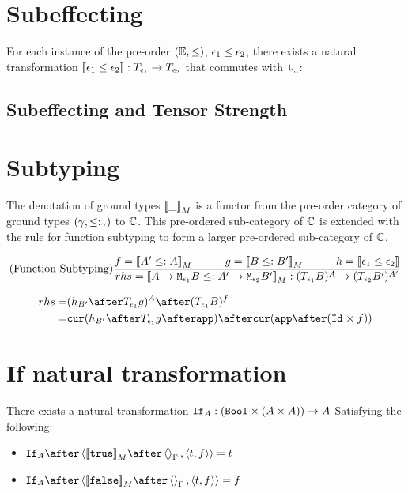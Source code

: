 \documentclass{report}
\begin{document}
\section{Subeffecting}
For each instance of the pre-order $(\mathbb{E}, \leq)$, $\epsilon_1 \leq \epsilon_2$, there exists a natural transformation
${\bf [\![}\epsilon_1 \leq \epsilon_2{\bf ]\!]}: T_{\epsilon_1}{} \rightarrow T_{\epsilon_2}{}$ that commutes with $\texttt{t}_{, , }$:

\subsection{Subeffecting and Tensor Strength}


\section{Subtyping}

The denotation of ground types ${\bf [\![}\_{\bf ]\!]}_M$ is a functor from the pre-order category of ground types $(\gamma, \leq:_{\gamma})$
to $\mathbb{C}$. This pre-ordered sub-category of $\mathbb{C}$ is extended with the rule for function subtyping to form a larger pre-ordered sub-category of $\mathbb{C}$.

$$
\treerule{Function Subtyping}{f = \deno{A' \subtype A} \s\s g = \deno{B \subtype B'} \s\s h=\dse{\e_1}{\e_2}}{rhs = \deno{\lamtype{A}{\e_1}{B} \subtype \lamtype{A'}{\e_2}{B'}}: (\T{\e_1}{B})^A \rightarrow (\T{\e_2}{B'})^{A'}}
$$

\begin{equation}
    \begin{split}
        rhs = & (h_{B'} \after \T{\e_1}{g})^A \after (\T{\e_1}{B})^f \\
        = & \cur{h_{B'}  \after \T{\e_1}{g}\after \app} \after \cur{\app \after (\Id{} \times f)}\\
    \end{split}
\end{equation}



\section{If natural transformation}
There exists a natural transformation $\texttt{If}_{A}: (\texttt{Bool} \times (A \times A)) \rightarrow A$
Satisfying the following:
\begin{itemize}
    \item $\ifnt{A}  \after \pr{\deno{\t}\after \term{\G}}{\pr{t}{f}} = t$
    \item $\ifnt{A} \after \pr{\deno{\f}\after \term{\G}}{\pr{t}{f}} = f$
\end{itemize}
\end{document}
